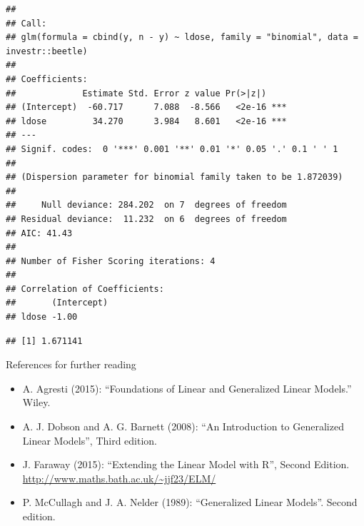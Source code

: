 \documentclass[
  ignorenonframetext,
]{beamer}
\newenvironment{Shaded}{\begin{snugshade}}{\end{snugshade}}
\newcommand{\AttributeTok}[1]{\textcolor[rgb]{0.13,0.29,0.53}{#1}}
\newcommand{\CommentTok}[1]{\textcolor[rgb]{0.56,0.35,0.01}{\textit{#1}}}
\newcommand{\FunctionTok}[1]{\textcolor[rgb]{0.13,0.29,0.53}{\textbf{#1}}}
\newcommand{\NormalTok}[1]{#1}
\newcommand{\OtherTok}[1]{\textcolor[rgb]{0.56,0.35,0.01}{#1}}
\newcommand{\SpecialCharTok}[1]{\textcolor[rgb]{0.81,0.36,0.00}{\textbf{#1}}}
\newcommand{\StringTok}[1]{\textcolor[rgb]{0.31,0.60,0.02}{#1}}
\providecommand{\tightlist}{%
  \setlength{\itemsep}{0pt}\setlength{\parskip}{0pt}}
\begin{document}
\begin{frame}[fragile]
\begin{verbatim}
## 
## Call:
## glm(formula = cbind(y, n - y) ~ ldose, family = "binomial", data = investr::beetle)
## 
## Coefficients:
##             Estimate Std. Error z value Pr(>|z|)    
## (Intercept)  -60.717      7.088  -8.566   <2e-16 ***
## ldose         34.270      3.984   8.601   <2e-16 ***
## ---
## Signif. codes:  0 '***' 0.001 '**' 0.01 '*' 0.05 '.' 0.1 ' ' 1
## 
## (Dispersion parameter for binomial family taken to be 1.872039)
## 
##     Null deviance: 284.202  on 7  degrees of freedom
## Residual deviance:  11.232  on 6  degrees of freedom
## AIC: 41.43
## 
## Number of Fisher Scoring iterations: 4
## 
## Correlation of Coefficients:
##       (Intercept)
## ldose -1.00
\end{verbatim}

\begin{Shaded}
\end{Shaded}

\begin{verbatim}
## [1] 1.671141
\end{verbatim}
\end{frame}

\begin{frame}{References for further reading}
\label{references-for-further-reading}
\begin{itemize}
\tightlist
\item
  A. Agresti (2015): ``Foundations of Linear and Generalized Linear
  Models.'' Wiley.
\item
  A. J. Dobson and A. G. Barnett (2008): ``An Introduction to
  Generalized Linear Models'', Third edition.
\item
  J. Faraway (2015): ``Extending the Linear Model with R'', Second
  Edition. \url{http://www.maths.bath.ac.uk/~jjf23/ELM/}
\item
  P. McCullagh and J. A. Nelder (1989): ``Generalized Linear Models''.
  Second edition.
\end{itemize}
\end{frame}
\end{document}

